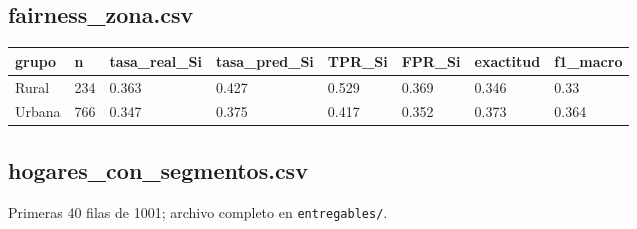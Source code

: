 \subsection*{fairness\_zona.csv}
{\footnotesize\begin{longtable}{@{}llllllll@{}}
\toprule
grupo & n & tasa\_real\_Si & tasa\_pred\_Si & TPR\_Si & FPR\_Si & exactitud & f1\_macro \\
\midrule\endhead
Rural & 234 & 0.363 & 0.427 & 0.529 & 0.369 & 0.346 & 0.33 \\
Urbana & 766 & 0.347 & 0.375 & 0.417 & 0.352 & 0.373 & 0.364 \\
\bottomrule
\end{longtable}}
\subsection*{hogares\_con\_segmentos.csv}
{\footnotesize Primeras 40 filas de 1001; archivo completo en \texttt{entregables/}.}\\
